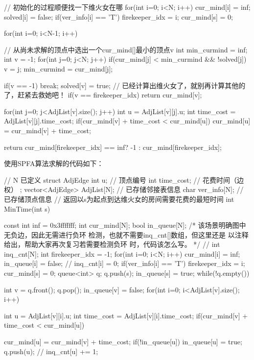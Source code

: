 \begin{exerciseanswer}
\begin{cppcode}
{        // 初始化的过程顺便找一下维火女在哪
        for(int i=0; i<N; i++) {
            cur_mind[i] = inf;
            solved[i] = false;
            if(ver_info[i] == 'T') {
                firekeeper_idx = i;
            }
        }
        cur_mind[s] = 0;

        for(int i=0; i<N-1; i++) {
            // 从尚未求解的顶点中选出一个cur_mind[]最小的顶点v
            int min_curmind = inf;
            int v = -1;
            for(int j=0; j<N; j++) {
                if(cur_mind[j] < min_curmind && !solved[j]) {
                    v = j;
                    min_curmind = cur_mind[j];
                }
            }

            if(v == -1) {
                break;
            }
            solved[v] = true;
            // 已经计算出维火女了，就别再计算其他的了，赶紧去救她吧！
            if(v == firekeeper_idx) {
                return cur_mind[v];
            }

            for(int j=0; j<AdjList[v].size(); j++) {
                int u = AdjList[v][j].u;
                int time_cost = AdjList[v][j].time_cost;
                if(cur_mind[v] + time_cost < cur_mind[u]) {
                    cur_mind[u] = cur_mind[v] + time_cost;
                }
            }
            
        }
        return cur_mind[firekeeper_idx] == inf? -1 : cur_mind[firekeeper_idx];
    }
\end{cppcode}

使用SPFA算法求解的代码如下：
\begin{cppcode}
    // N 已定义
    struct AdjEdge {
        int u;          // 顶点编号
        int time_cost;  // 花费时间（边权）
    };
    vector<AdjEdge> AdjList[N];    // 已存储邻接表信息 
    char ver_info[N];   // 已存储顶点信息
    // 返回以s为起点到达维火女的房间需要花费的最短时间
    int MinTime(int s) {
        const int inf = 0x3fffffff;
        int cur_mind[N];
        bool in_queue[N];
        /* 该场景明确图中无负边，因此无需进行负环
        检测，也就不需要inq_cnt[]数组，但这里还是
        以注释给出，帮助大家再次复习若需要检测负环
        时，代码该怎么写。 */
        // int inq_cnt[N];  
        int firekeeper_idx = -1;
        for(int i=0; i<N; i++) {
            cur_mind[i] = inf;
            in_queue[i] = false;
            // inq_cnt[i] = 0;
            if(ver_info[i] == 'T') {
                firekeeper_idx = i;
            }
        }
        cur_mind[s] = 0;
        queue<int> q;
        q.push(s);
        in_queue[s] = true;
        while(!q.empty()) {
            int v = q.front();
            q.pop();
            in_queue[v] = false;
            for(int i=0; i<AdjList[v].size(); i++) {
                int u = AdjList[v][i].u; 
                int time_cost = AdjList[v][i].time_cost;
                if(cur_mind[v] + time_cost < cur_mind[u]) {
                    cur_mind[u] = cur_mind[v] + time_cost;
                    if(!in_queue[u]) {
                        in_queue[u] = true;
                        q.push(u);
                        // inq_cnt[u] += 1;
                    }

}}}}
\end{cppcode}
\end{exerciseanswer}
